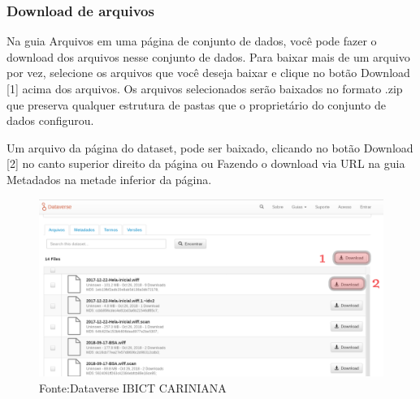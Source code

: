 \documentclass[12pt,hidelinks]{article}
\begin{document}
    	\subsubsection{Download de arquivos}
    	
\qquad Na guia Arquivos em uma página de conjunto de dados, você pode fazer o download dos arquivos nesse conjunto de dados. Para baixar mais de um arquivo por vez, selecione os arquivos que você deseja baixar e clique no botão Download [1] acima dos arquivos. Os arquivos selecionados serão baixados no formato .zip que preserva qualquer estrutura de pastas que o proprietário do conjunto de dados configurou.

Um arquivo da página do dataset, pode ser baixado, clicando no botão Download [2] no canto superior direito da página ou Fazendo o download via URL na guia Metadados na metade inferior da página.

\begin{figure}[H]
\centering
    \includegraphics[width=1.0\textwidth]{Prints/p3.png}
    \caption{Fonte:Dataverse IBICT CARINIANA}
    \label{print3}
\end{figure}
    	
\end{document}

